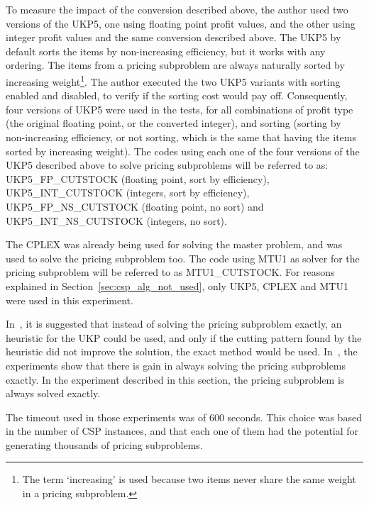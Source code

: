 To measure the impact of the conversion described above, the author used two versions of the UKP5, one using floating point profit values, and the other using integer profit values and the same conversion described above.
The UKP5 by default sorts the items by non-increasing efficiency, but it works with any ordering.
The items from a pricing subproblem are always naturally sorted by increasing weight\footnote{The term `increasing' is used because two items never share the same weight in a pricing subproblem.}.
The author executed the two UKP5 variants with sorting enabled and disabled, to verify if the sorting cost would pay off.
Consequently, four versions of UKP5 were used in the tests, for all combinations of profit type (the original floating point, or the converted integer), and sorting (sorting by non-increasing efficiency, or not sorting, which is the same that having the items sorted by increasing weight).
The codes using each one of the four versions of the UKP5 described above to solve pricing subproblems will be referred to as: UKP5\_FP\_CUTSTOCK (floating point, sort by efficiency), UKP5\_INT\_CUTSTOCK (integers, sort by efficiency), UKP5\_FP\_NS\_CUTSTOCK (floating point, no sort) and UKP5\_INT\_NS\_CUTSTOCK (integers, no sort). 

The CPLEX was already being used for solving the master problem, and was used to solve the pricing subproblem too.
The code using MTU1 as solver for the pricing subproblem will be referred to as MTU1\_CUTSTOCK.
For reasons explained in Section~\ref{sec:csp_alg_not_used}, only UKP5, CPLEX and MTU1 were used in this experiment.

In~\cite{gg-61}, it is suggested that instead of solving the pricing subproblem exactly, an heuristic for the UKP could be used, and only if the cutting pattern found by the heuristic did not improve the solution, the exact method would be used.
In~\cite[p.~17]{gg-63}, the experiments show that there is gain in always solving the pricing subproblems exactly. %
In the experiment described in this section, the pricing subproblem is always solved exactly.

The timeout used in those experiments was of 600 seconds.
This choice was based in the number of CSP instances, and that each one of them had the potential for generating thousands of pricing subproblems.

